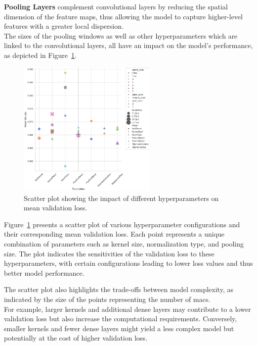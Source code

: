 \textbf{Pooling Layers} complement convolutional layers by reducing the spatial dimension of the feature maps,
thus allowing the model to capture higher-level features with a greater local dispersion. \\

The sizes of the pooling windows as well as other hyperparameters which are linked to the convolutional layers, all have
an impact on the model's performance, as depicted in Figure~\ref{fig:param_impact}.

\begin{figure}[H]
    \centering
    \includegraphics[width=0.6\textwidth]{figures/06_ModelExploration/4_CNN/scatter.png}
    \caption{Scatter plot showing the impact of different hyperparameters on mean validation loss.}
    \label{fig:param_impact}
\end{figure}

Figure~\ref{fig:param_impact} presents a scatter plot of various hyperparameter configurations and their corresponding
mean validation loss. Each point represents a unique combination of parameters such as kernel size, normalization type,
and pooling size. The plot indicates the sensitivities of the validation loss to these hyperparameters, with certain
configurations leading to lower loss values and thus better model performance.

The scatter plot also highlights the trade-offs between model complexity, as indicated by the size of the points
representing the number of \glspl{mac}.\\
For example, larger kernels and additional dense layers may contribute
to a lower validation loss but also increase the computational requirements. Conversely, smaller kernels and fewer dense
layers might yield a less complex model but potentially at the cost of higher validation loss.

